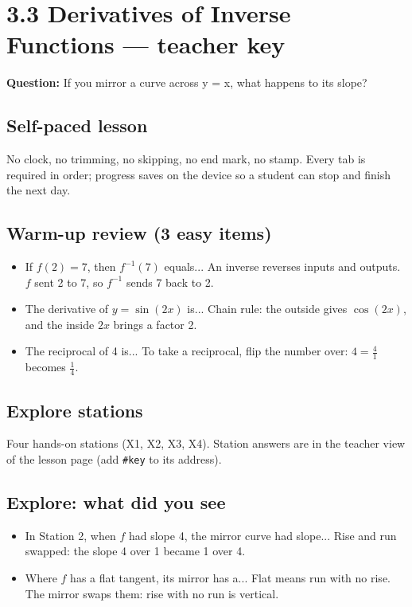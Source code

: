 \documentclass[11pt]{article}
\begin{document}
\section*{3.3 Derivatives of Inverse Functions --- teacher key}
\textbf{Question:} If you mirror a curve across y = x, what happens to its slope?\par
\subsection*{Self-paced lesson}No clock, no trimming, no skipping, no end mark, no stamp. Every tab is required in order; progress saves on the device so a student can stop and finish the next day.\par
\subsection*{Warm-up review (3 easy items)}\begin{itemize}
\item If $f(2)=7$, then $f^{-1}(7)$ equals...  An inverse reverses inputs and outputs. $f$ sent 2 to 7, so $f^{-1}$ sends 7 back to 2.
\item The derivative of $y=\sin(2x)$ is...  Chain rule: the outside gives $\cos(2x)$, and the inside $2x$ brings a factor 2.
\item The reciprocal of 4 is...  To take a reciprocal, flip the number over: $4=\tfrac41$ becomes $\tfrac14$.
\end{itemize}
\subsection*{Explore stations}Four hands-on stations (X1, X2, X3, X4). Station answers are in the teacher view of the lesson page (add \texttt{\#key} to its address).\par
\subsection*{Explore: what did you see}\begin{itemize}
\item In Station 2, when $f$ had slope 4, the mirror curve had slope...  Rise and run swapped: the slope 4 over 1 became 1 over 4.
\item Where $f$ has a flat tangent, its mirror has a...  Flat means run with no rise. The mirror swaps them: rise with no run is vertical.
\end{itemize}
\end{document}
